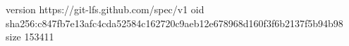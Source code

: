 version https://git-lfs.github.com/spec/v1
oid sha256:c847fb7e13afc4cda52584c162720c9aeb12e678968d160f3f6b2137f5b94b98
size 153411
